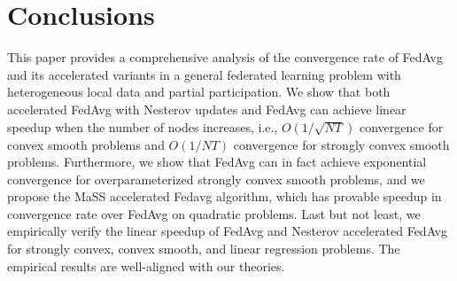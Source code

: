 
\section{Conclusions}
This paper provides a comprehensive analysis of the convergence rate of FedAvg
and its accelerated variants in a general federated learning problem with heterogeneous local data and partial participation. We show that both accelerated FedAvg with Nesterov updates and FedAvg
can achieve linear speedup when the number of nodes increases, i.e., $O(1/\sqrt{NT})$
convergence for convex smooth problems and $O(1/NT)$ convergence for strongly 
convex smooth problems. Furthermore, we show that FedAvg can in fact achieve exponential 
convergence for overparameterized strongly convex smooth problems, and we propose the MaSS accelerated Fedavg algorithm, which has provable speedup in convergence rate over
FedAvg on quadratic problems. Last but not least, we empirically
verify the linear speedup of FedAvg and Nesterov accelerated FedAvg for strongly convex, convex smooth, and linear regression problems. The empirical results are well-aligned with our theories. 